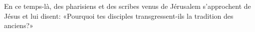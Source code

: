 En ce temps-là, des pharisiens et des scribes venus de Jérusalem
	s’approchent de Jésus et lui disent:
	«Pourquoi tes disciples transgressent-ils la tradition des anciens?»
